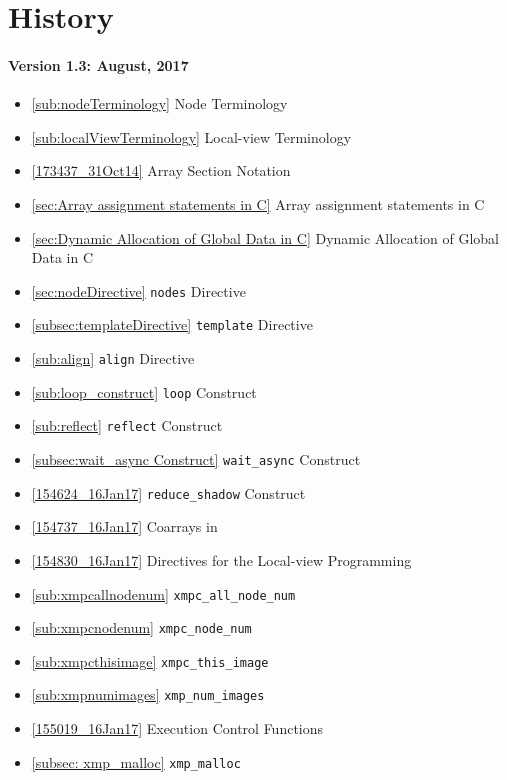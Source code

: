 \section*{History}

\paragraph*{Version 1.3: August, 2017}

\begin{itemize}
  \item \ref{sub:nodeTerminology}      Node Terminology
  \item \ref{sub:localViewTerminology} Local-view Terminology
  \item \ref{173437_31Oct14}           Array Section Notation
  \item \ref{sec:Array assignment statements in C} Array assignment
		statements in C
  \item \ref{sec:Dynamic Allocation of Global Data in C} Dynamic
		Allocation of Global Data in C
  \item \ref{sec:nodeDirective}        {\tt nodes} Directive
  \item \ref{subsec:templateDirective} {\tt template} Directive
  \item \ref{sub:align}                {\tt align} Directive
  \item \ref{sub:loop_construct}       {\tt loop} Construct
  \item \ref{sub:reflect}              {\tt reflect} Construct
  \item \ref{subsec:wait_async Construct} {\tt wait\_async} Construct
  \item \ref{154624_16Jan17}           {\tt reduce\_shadow} Construct
  \item \ref{154737_16Jan17}           Coarrays in {\XMPC}
  \item \ref{154830_16Jan17}           Directives for the Local-view
		Programming
  \item \ref{sub:xmpcallnodenum}       {\tt xmpc\_all\_node\_num}
  \item \ref{sub:xmpcnodenum}          {\tt xmpc\_node\_num}
  \item \ref{sub:xmpcthisimage}        {\tt xmpc\_this\_image}
  \item \ref{sub:xmpnumimages}         {\tt xmp\_num\_images}
  \item \ref{155019_16Jan17}           Execution Control Functions
  \item \ref{subsec: xmp_malloc}       {\tt xmp\_malloc}

\end{itemize}
